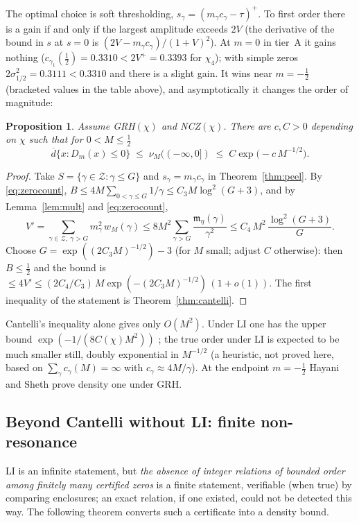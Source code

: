 \documentclass[11pt]{amsart}
\newtheorem{proposition}[theorem]{Proposition}
\theoremstyle{definition}
\numberwithin{equation}{section}
\newcommand{\cZ}{\mathcal Z}          %
\newcommand{\dup}{\overline{d}}
\begin{document}
The optimal choice is soft thresholding,
$s_\gamma=(m_\gamma c_\gamma-\tau)^+$. To first order there is a gain
if and only if the largest amplitude exceeds $2V$ (the derivative of
the bound in $s$ at $s=0$ is $(2V-m_\gamma c_\gamma)/(1+V)^2$). At
$m=0$ in tier~A it gains nothing ($c_{\gamma_1}(\tfrac12)=0.3310
<2V^+=0.3393$ for $\chi_4$); with simple zeros
$2\sigma_{1/2}^2=0.3111<0.3310$ and there is a slight gain. It wins
near $m=-\tfrac12$ (bracketed values in the table above), and
asymptotically it changes the order of magnitude:

\begin{proposition}\label{prop:endpoint}
Assume GRH$(\chi)$ and NCZ$(\chi)$. There are $c,C>0$ depending on
$\chi$ such that for $0<M\le\tfrac12$
\[
\dup\{x:D_m(x)\le0\}\;\le\;\nu_M((-\infty,0])\;\le\;
C\exp\bigl(-c\,M^{-1/2}\bigr).
\]
\end{proposition}

\begin{proof}
Take $S=\{\gamma\in\cZ:\gamma\le G\}$ and $s_\gamma=m_\gamma c_\gamma$
in Theorem~\ref{thm:peel}. By \eqref{eq:zerocount},
$B\le4M\sum_{0<\gamma\le G}1/\gamma\le C_3M\log^2(G+3)$, and by
Lemma~\ref{lem:mult} and \eqref{eq:zerocount},
\[
V'=\sum_{\gamma\in\cZ,\ \gamma>G}m_\gamma^2\,w_M(\gamma)
\le8M^2\sum_{\gamma>G}\frac{\mathfrak m_\eta(\gamma)}{\gamma^2}
\le C_4\,M^2\,\frac{\log^2(G+3)}{G}.
\]
Choose $G=\exp((2C_3M)^{-1/2})-3$ (for $M$ small; adjust $C$
otherwise): then $B\le\tfrac12$ and the bound is
$\le4V'\le(2C_4/C_3)\,M\exp(-(2C_3M)^{-1/2})\,(1+o(1))$. The first
inequality of the statement is Theorem~\ref{thm:cantelli}.
\end{proof}

Cantelli's inequality alone gives only $O(M^2)$. Under LI one has the
upper bound $\exp(-1/(8C(\chi)M^2))$ \cite[Theorem~1(iii)]{WR}; the
true order under LI is expected to be much smaller still, doubly
exponential in $M^{-1/2}$ (a heuristic, not proved here, based on
$\sum_\gamma c_\gamma(M)=\infty$ with
$c_\gamma\approx4M/\gamma$). At the endpoint
$m=-\tfrac12$ Hayani \cite{Hay25} and Sheth \cite{Sheth24} prove
density one under GRH.

\subsection{Beyond Cantelli without LI: finite non-resonance}
\label{subsec:NR}

LI is an infinite statement, but \emph{the absence of integer
relations of bounded order among finitely many certified zeros} is a
finite statement, verifiable (when true) by comparing enclosures; an
exact relation, if one existed, could not be detected this way. The
following theorem converts such a certificate into a density bound.
\end{document}
